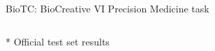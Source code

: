 \begin{frame}[t]{BioTC: BioCreative VI Precision Medicine task}
\begin{tabular}{rD{40mm}lrrrr}
\end{tabular}

\vspace*{5mm}

* Official test set results

\end{frame}
